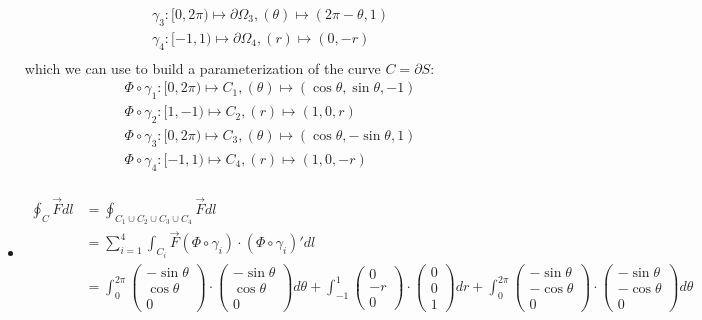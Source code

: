 \documentclass[11pt]{article}
\begin{document}
\begin{solution}
\begin{itemize}
\begin{align*}
	&\gamma_3: [0,2\pi) \mapsto \partial \Omega_3, (\theta) \mapsto (2\pi - \theta, 1)\\
	&\gamma_4: [-1,1) \mapsto \partial \Omega_4, (r) \mapsto (0, -r)\\
	\end{align*}
	which we can use to build a parameterization of the curve $C = \partial S$:
	\begin{align*}
	&\Phi \circ \gamma_1: [0,2\pi) \mapsto C_1, (\theta) \mapsto (\cos \theta, \sin \theta, -1)\\
	&\Phi \circ \gamma_2: [1,-1)  \mapsto C_2, (r) \mapsto (1, 0, r)\\
	&\Phi \circ \gamma_3: [0,2\pi) \mapsto C_3, (\theta) \mapsto (\cos \theta, -\sin \theta, 1)\\
	&\Phi \circ \gamma_4: [-1,1) \mapsto C_4, (r) \mapsto (1, 0, -r)\\
	\end{align*}
    \item 
	\begin{align*}
	\oint_C \vec F dl 
	&= 
	\oint_{C_1 \cup C_2 \cup C_3\cup C_4} \vec F dl
	\\
	&= 
	\sum_{i = 1}^4\int_{C_i} \vec F(\Phi\circ \gamma_i) \cdot (\Phi\circ \gamma_i)'dl 
	\\
	&= \int_0^{2\pi} \begin{pmatrix}-\sin \theta\\\cos \theta\\0\end{pmatrix}\cdot\begin{pmatrix}-\sin \theta\\\cos \theta\\ 0\end{pmatrix}d\theta 
	+ 
	\int_{-1}^{1} \begin{pmatrix}0\\-r\\0\end{pmatrix}\cdot\begin{pmatrix}0\\0\\1\end{pmatrix}dr 
	+ 
	\int_0^{2\pi} \begin{pmatrix}-\sin \theta\\ -\cos \theta\\0\end{pmatrix}\cdot\begin{pmatrix}-\sin \theta\\-\cos \theta\\ 0\end{pmatrix}d\theta 

\end{align*}
\end{itemize}
\end{solution}
\end{document}
